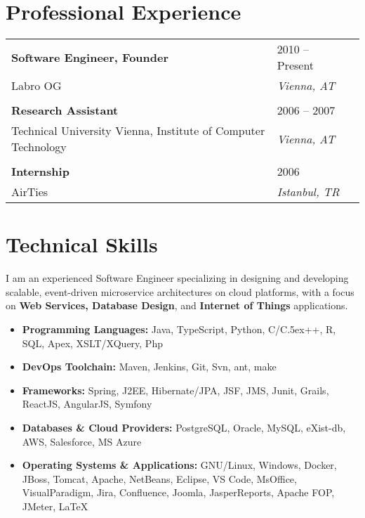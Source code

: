 \documentclass[11pt,a4paper,oneside]{article}
\def\Cplusplus{{\rm C\raise.5ex\hbox{\tiny ++}}}
\begin{document}

\section{\bf Professional Experience}
\begin{longtable}{  L{0.70\textwidth}  R{0.25\textwidth}  R{0.05\textwidth }} 
\textbf{Software Engineer, Founder} & 2010 -- Present \\
Labro OG & \textit{Vienna, AT} \\
\vspace{1pt}\\
\textbf{Research Assistant} & 2006 -- 2007\\
Technical University Vienna, Institute of Computer Technology & \textit{Vienna, AT} \\
\vspace{1pt}\\
\textbf{Internship} & 2006\\
AirTies & \textit{Istanbul, TR} \\
\end{longtable}

\section{\bf Technical Skills}
\begin{adjustwidth}{1.5em}{2em}
I am an experienced Software Engineer specializing in designing and developing scalable, event-driven microservice architectures on cloud platforms, with a focus on  \textbf{Web Services, Database Design}, and  \textbf{Internet of Things} applications. 

\begin{itemize}[leftmargin=0em]
\item \textbf{Programming Languages:} Java, TypeScript, Python, C/\Cplusplus, R, SQL, Apex, XSLT/XQuery, Php
\item \textbf{DevOps Toolchain:} Maven, Jenkins, Git, Svn, ant, make
\item \textbf{Frameworks:} Spring, J2EE, Hibernate/JPA, JSF, JMS, Junit, Grails, ReactJS, AngularJS, Symfony
\item \textbf{Databases \& Cloud Providers:}  PostgreSQL, Oracle, MySQL, eXist-db, AWS, Salesforce, MS Azure
\item \textbf{Operating Systems \& Applications:}  GNU/Linux, Windows, Docker, JBoss, Tomcat, Apache, NetBeans, Eclipse, VS Code, MsOffice, VisualParadigm, Jira, Confluence, Joomla, JasperReports, Apache FOP, JMeter, \LaTeX
\end{itemize}
\end{adjustwidth}
\end{document}

